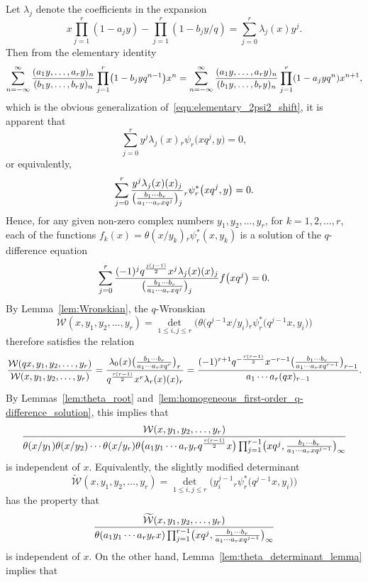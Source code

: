 \documentclass[pdftex]{sigma}
\numberwithin{equation}{section}
\begin{document}
Let $\lambda_j$ denote the coefficients in the expansion
\[ x\prod_{j=1}^r (1-a_jy) - \prod_{j=1}^r (1-b_j y/q)= \sum_{j=0}^r \lambda_j(x) y^j. \]
Then from the elementary identity
\[ \sum_{n=-\infty}^\infty {(a_1y,\dots,a_ry)_n \over (b_1y,\dots,b_ry)_n} \prod_{j=1}^r\bigl(1-b_jyq^{n-1}\bigr) x^n = \sum_{n=-\infty}^\infty {(a_1y,\dots,a_ry)_n \over (b_1y,\dots,b_ry)_n} \prod_{j=1}^r(1-a_jyq^n) x^{n+1}, \]
which is the obvious generalization of~\eqref{eqn:elementary_2psi2_shift}, it is apparent that
\[ \sum_{j=0}^r y^j \lambda_j(x) {}_r\psi_r\bigl(xq^j,y\bigr) = 0, \]
or equivalently,
\begin{equation} \label{eqn:rpsir_ast_linear_relation}
\sum_{j=0}^r {y^j \lambda_j(x) (x)_j \over \bigl({b_1\cdots b_r \over a_1\cdots a_r xq^j}\bigr)_j} {}_r^{}\psi_r^\ast\big(xq^j,y\big) = 0.
\end{equation}
Hence, for any given non-zero complex numbers $y_1, y_2, \dots, y_r$, for $k=1,2,\dots,r$, each of the functions $f_k(x) = \theta(x/y_k) {}_r^{}\psi_r^\ast(x,y_k)$ is a solution of the $q$-difference equation
\[ \sum_{j=0}^r {(-1)^j q^{j(j-1) \over 2} x^j \lambda_j(x) (x)_j \over \bigl({b_1\cdots b_r \over a_1\cdots a_r xq^j}\bigr)_j} f\bigl(xq^j\bigr) = 0. \]
By Lemma~\ref{lem:Wronskian}, the $q$-Wronskian
\[ \mathcal{W}(x,y_1,y_2,\dots,y_r) = \det_{1 \leq i,j \leq r}\bigl( \theta\bigl(q^{j-1}x/y_i\bigr) {}_r^{}\psi_r^\ast\bigl(q^{j-1}x,y_i\bigr) \bigr) \]
therefore satisfies the relation
\[ {\mathcal{W}(qx,y_1,y_2,\dots,y_r) \over \mathcal{W}(x,y_1,y_2,\dots,y_r)} = {\lambda_0(x) \bigl({b_1\cdots b_r \over a_1\cdots a_r xq^r}\bigr)_r \over q^{r(r-1) \over 2} x^r \lambda_r(x) (x)_r} = {(-1)^{r+1} q^{-{r(r-1) \over 2}} x^{-r-1} \bigl({b_1\cdots b_r \over a_1\cdots a_r xq^{r-1}}\bigr)_{r-1} \over a_1\cdots a_r (qx)_{r-1}}. \]
By Lemmas~\ref{lem:theta_root} and~\ref{lem:homogeneous_first-order_q-difference_solution}, this implies that
\[ {\mathcal{W}(x,y_1,y_2,\dots,y_r) \over \theta(x/y_1)\theta(x/y_2) \cdots \theta(x/y_r) \theta\bigl(a_1 y_1 \cdots a_r y_r q^{r(r-1) \over 2} x\bigr) \prod_{j=1}^{r-1} \bigl(xq^j,{b_1\cdots b_r \over a_1\cdots a_r x q^{j-1}}\bigr)_\infty} \]
is independent of $x$. Equivalently, the slightly modified determinant
\[ \widetilde{\mathcal{W}}(x,y_1,y_2,\dots,y_r) = \det_{1 \leq i,j \leq r}\bigl( y_i^{j-1} {}_r^{}\psi_r^\ast\bigl(q^{j-1}x,y_i\bigr) \bigr) \]
has the property that
\[ {\widetilde{\mathcal{W}}(x,y_1,y_2,\dots,y_r) \over \theta(a_1y_1\cdots a_ry_r x)\prod_{j=1}^{r-1} \bigl(xq^j,{b_1\cdots b_r \over a_1\cdots a_r x q^{j-1}}\bigr)_\infty} \]
is independent of $x$. On the other hand, Lemma~\ref{lem:theta_determinant_lemma} implies that
\end{document}
